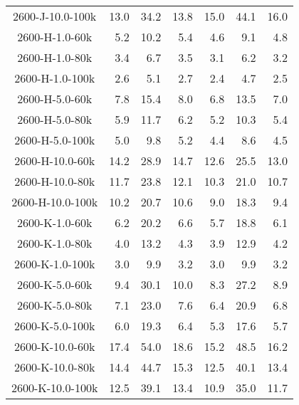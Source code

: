 \begin{longtable}{crrrrrr}
      2600-J-10.0-100k &  13.0 &  34.2 &  13.8 &  15.0 &  44.1 &  16.0 \\
      2600-H-1.0-60k   &   5.2 &  10.2 &   5.4 &   4.6 &   9.1 &   4.8 \\
      2600-H-1.0-80k   &   3.4 &   6.7 &   3.5 &   3.1 &   6.2 &   3.2 \\
      2600-H-1.0-100k  &   2.6 &   5.1 &   2.7 &   2.4 &   4.7 &   2.5 \\
      2600-H-5.0-60k   &   7.8 &  15.4 &   8.0 &   6.8 &  13.5 &   7.0 \\
      2600-H-5.0-80k   &   5.9 &  11.7 &   6.2 &   5.2 &  10.3 &   5.4 \\
      2600-H-5.0-100k  &   5.0 &   9.8 &   5.2 &   4.4 &   8.6 &   4.5 \\
      2600-H-10.0-60k  &  14.2 &  28.9 &  14.7 &  12.6 &  25.5 &  13.0 \\
      2600-H-10.0-80k  &  11.7 &  23.8 &  12.1 &  10.3 &  21.0 &  10.7 \\
      2600-H-10.0-100k &  10.2 &  20.7 &  10.6 &   9.0 &  18.3 &   9.4 \\
      2600-K-1.0-60k   &   6.2 &  20.2 &   6.6 &   5.7 &  18.8 &   6.1 \\
      2600-K-1.0-80k   &   4.0 &  13.2 &   4.3 &   3.9 &  12.9 &   4.2 \\
      2600-K-1.0-100k  &   3.0 &   9.9 &   3.2 &   3.0 &   9.9 &   3.2 \\
      2600-K-5.0-60k   &   9.4 &  30.1 &  10.0 &   8.3 &  27.2 &   8.9 \\
      2600-K-5.0-80k   &   7.1 &  23.0 &   7.6 &   6.4 &  20.9 &   6.8 \\
      2600-K-5.0-100k  &   6.0 &  19.3 &   6.4 &   5.3 &  17.6 &   5.7 \\
      2600-K-10.0-60k  &  17.4 &  54.0 &  18.6 &  15.2 &  48.5 &  16.2 \\
      2600-K-10.0-80k  &  14.4 &  44.7 &  15.3 &  12.5 &  40.1 &  13.4 \\
      2600-K-10.0-100k &  12.5 &  39.1 &  13.4 &  10.9 &  35.0 & 11.7
    \label{tab:rv_aces_btsettl}
\end{longtable}


\clearpage{}


